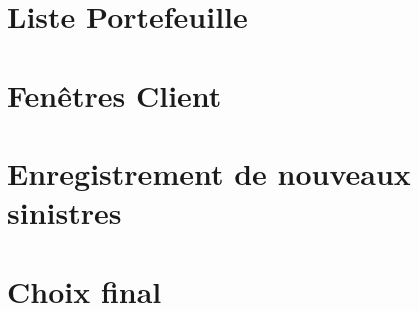 \documentclass[10pt,a4paper]{article}
\begin{document}
\section{Liste Portefeuille}


\section{Fenêtres Client}

\section{Enregistrement de nouveaux sinistres}

\section{Choix final}
\end{document}
